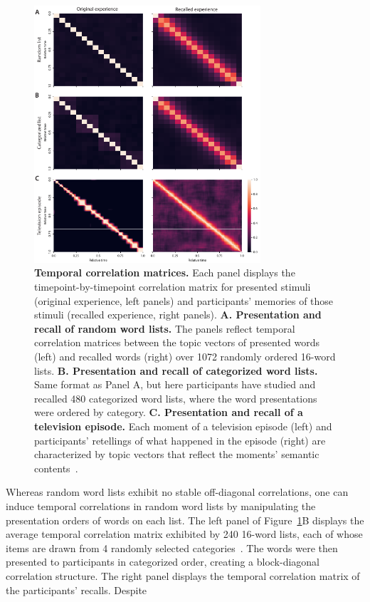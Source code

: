 \documentclass{article}
\begin{document}
\begin{figure}[tp] \centering \includegraphics[width=0.75\textwidth]{figs/pres_rec_corrmats} \caption{\textbf{Temporal correlation matrices.}  Each panel displays the timepoint-by-timepoint correlation matrix for presented stimuli (original experience, left panels) and participants' memories of those stimuli (recalled experience, right panels).  \textbf{A. Presentation and recall of random word lists.}  The panels reflect temporal correlation matrices between the topic vectors of presented words (left) and recalled words (right) over 1072 randomly ordered 16-word lists.  \textbf{B. Presentation and recall of categorized word lists.}  Same format as Panel A, but here participants have studied and recalled 480 categorized word lists, where the word presentations were ordered by category.  \textbf{C. Presentation and recall of a television episode.} Each moment of a television episode (left) and participants' retellings of what happened in the episode (right) are characterized by topic vectors that reflect the moments' semantic contents~\citep{HeusEtal18c}.}
\label{fig:corrmats}
\end{figure}

Whereas random word lists exhibit no stable off-diagonal correlations, one can induce temporal correlations in random word lists by manipulating the presentation orders of words on each list.  The left panel of Figure~\ref{fig:corrmats}B displays the average temporal correlation matrix exhibited by 240 16-word lists, each of whose items are drawn from 4 randomly selected categories~\citep{ZimaEtal18}.  The words were then presented to participants in categorized order, creating a block-diagonal correlation structure.  The right panel displays the temporal correlation matrix of the participants' recalls.  Despite 
\end{document}
